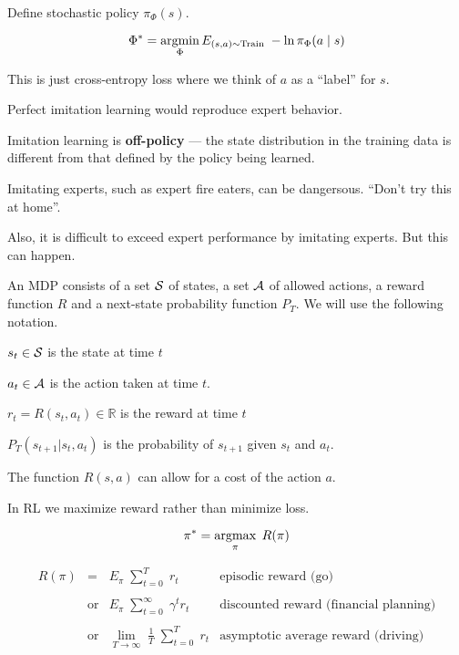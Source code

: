 {\vfill
Define stochastic policy $\pi_\Phi(s)$.

\vfill
$$\Phi^* = \operatorname*{argmin}_\Phi E_{(s,a) \sim \mathrm{Train}}\;- \ln \pi_\Phi(a\;|\;s)$$

\vfill
This is just cross-entropy loss where we think of $a$ as a ``label'' for $s$.


Perfect imitation learning would reproduce expert behavior.

Imitation learning is {\bf off-policy} ---
the state distribution in the training data is different from that defined by the policy being learned.

\vfill
Imitating experts, such as expert fire eaters, can be dangersous.  ``Don't try this at home''.

\vfill
Also, it is difficult to exceed expert performance by imitating experts.  But this can happen.


An MDP consists of a set ${\cal S}$ of states, a set ${\cal A}$ of allowed actions, a reward function $R$
and a next-state probability function $P_T$.  We will use the following notation.

\vfill
$s_t \in {\cal S}$ is the state at time $t$

\vfill
$a_t \in {\cal A}$ is the action taken at time $t$.

\vfill
$r_t = R(s_t,a_t) \in \mathbb{R}$ is the reward at time $t$

\vfill
$P_T(s_{t+1}|s_t,a_t)$ is the probability of $s_{t+1}$ given $s_t$ and $a_t$.

\vfill
The function $R(s,a)$ can allow for a cost of the action $a$.


In RL we maximize reward rather than minimize loss.

$$\pi^* = \operatorname*{argmax}_\pi \;R(\pi)$$

\vfill
$$\begin{array}{rcll}
  R(\pi) & = & E_\pi\;\sum_{t=0}^T \;r_t &\mbox{episodic reward (go)} \\
\\
& \mbox{or} & E_\pi\;\sum_{t=0}^\infty \;\gamma^t r_t &\mbox{discounted reward (financial planning)} \\
\\
& \mbox{or} & \lim_{T \rightarrow \infty}\;\frac{1}{T} \;\sum_{t=0}^T \;r_t &\mbox{asymptotic average reward (driving)}
\end{array}$$


}
